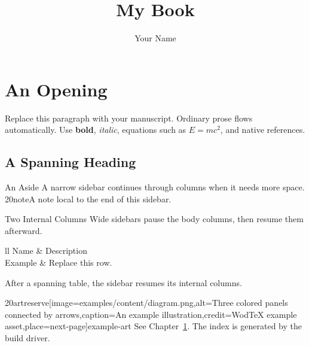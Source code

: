 \documentclass{m20book}
\title{My Book}
\author{Your Name}
\begin{document}
\maketitle
\tableofcontents
\chapter{An Opening}
\label{ch:opening}
Replace this paragraph with your manuscript. Ordinary prose flows automatically.
Use \textbf{bold}, \textit{italic}, equations such as $E=mc^2$, and native references.
\section{A Spanning Heading}
\begin{m20sidebar}[id=example-narrow]{An Aside}
A narrow sidebar continues through columns when it needs more space.
\m20note{A note local to the end of this sidebar.}
\end{m20sidebar}
\begin{m20sidebarwide}[columns=2,id=example-wide]{Two Internal Columns}
Wide sidebars pause the body columns, then resume them afterward.
\begin{m20table}[id=example-table,head-rows=1]{ll}
Name & Description \\ Example & Replace this row. \\
\end{m20table}
After a spanning table, the sidebar resumes its internal columns.
\end{m20sidebarwide}
\m20artreserve[image=examples/content/diagram.png,alt={Three colored panels connected by arrows},caption={An example illustration},credit={WodTeX example asset},place=next-page]{example-art}
See Chapter~\ref{ch:opening}. The index is generated by the build driver.
\printindex
\end{document}
